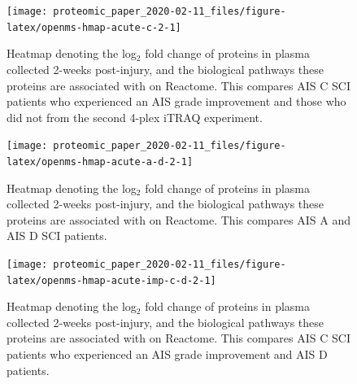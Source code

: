\documentclass[9pt,lineno]{elife}
\begin{document}
\begin{landscape}



\begin{figure}

{\centering \texttt{[image: proteomic\_paper\_2020-02-11\_files/figure-latex/openms-hmap-acute-c-2-1]} 

}

\caption[Heatmap - iTRAQ - Acute C Improvers VS Subacute Improvers]{Heatmap denoting the log\(_2\) fold change of proteins in plasma collected 2-weeks post-injury, and the biological pathways these proteins are associated with on Reactome. This compares AIS C SCI patients who experienced an AIS grade improvement and those who did not from the second 4-plex iTRAQ experiment.}\label{fig:openms-hmap-acute-c-2}
\end{figure}

\end{landscape}
\begin{landscape}



\begin{figure}

{\centering \texttt{[image: proteomic\_paper\_2020-02-11\_files/figure-latex/openms-hmap-acute-a-d-2-1]} 

}

\caption[Heatmap - iTRAQ - Acute A VS Acute D]{Heatmap denoting the log\(_2\) fold change of proteins in plasma collected 2-weeks post-injury, and the biological pathways these proteins are associated with on Reactome. This compares AIS A and AIS D SCI patients.}\label{fig:openms-hmap-acute-a-d-2}
\end{figure}

\end{landscape}
\begin{landscape}



\begin{figure}

{\centering \texttt{[image: proteomic\_paper\_2020-02-11\_files/figure-latex/openms-hmap-acute-imp-c-d-2-1]} 

}

\caption[Heatmap - iTRAQ - Acute C Improvers VS Acute D]{Heatmap denoting the log\(_2\) fold change of proteins in plasma collected 2-weeks post-injury, and the biological pathways these proteins are associated with on Reactome. This compares AIS C SCI patients who experienced an AIS grade improvement and AIS D patients.}\label{fig:openms-hmap-acute-imp-c-d-2}
\end{figure}

\end{landscape}
\end{document}
